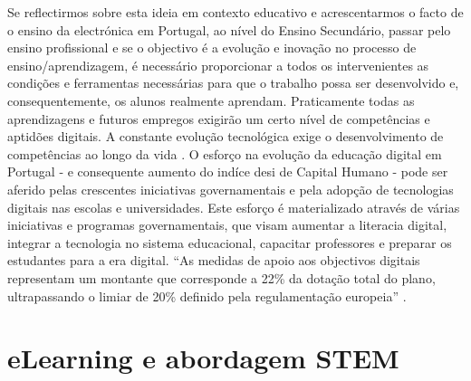 Se reflectirmos sobre esta ideia em contexto educativo e acrescentarmos o facto de o ensino da electrónica em Portugal, ao nível do Ensino Secundário, passar pelo ensino profissional e se o objectivo é a evolução e inovação no processo de ensino/aprendizagem, é necessário proporcionar a todos os intervenientes as condições e ferramentas necessárias para que o trabalho possa ser desenvolvido e, consequentemente, os alunos realmente aprendam. Praticamente todas as aprendizagens e futuros empregos exigirão um certo nível de competências e aptidões digitais. A constante evolução tecnológica exige o desenvolvimento de competências ao longo da vida \cite{Digitale13:online}. O esforço na evolução da educação digital em Portugal - e consequente aumento do indíce \acrshort{desi} de Capital Humano - pode ser aferido pelas crescentes iniciativas governamentais e pela adopção de tecnologias digitais nas escolas e universidades. Este esforço é materializado através de várias iniciativas e programas governamentais, que visam aumentar a literacia digital, integrar a tecnologia no sistema educacional, capacitar professores e preparar os estudantes para a era digital. ``As medidas de apoio aos objectivos digitais representam um montante que corresponde a 22\% da dotação total do plano, ultrapassando o limiar de 20\% definido pela regulamentação europeia'' \cite{Transicaodigitalprr}.

\section{eLearning e abordagem STEM} %
\label{sec:elearningstem}	%

